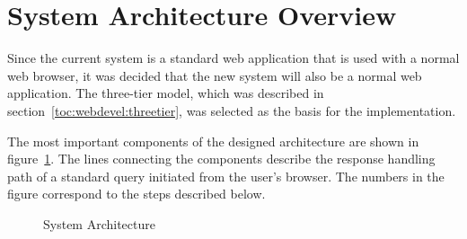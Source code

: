 \section{System Architecture Overview}
\label{toc:selected:architecture}

Since the current system is a standard web application that is used 
with a normal web browser, it was decided that the new system will 
also be a normal web application. The three-tier model, which was 
described in section~\ref{toc:webdevel:threetier}, was selected as the 
basis for the implementation.

The most important components of the designed architecture are shown 
in figure~\ref{fig:architecture}. The lines connecting the components 
describe the response handling path of a standard query initiated from 
the user's browser. The numbers in the figure correspond to the steps 
described below.

\begin{figure}
\begin{center}
  \caption{System Architecture}
  \label{fig:architecture}
\end{center}
\end{figure}

